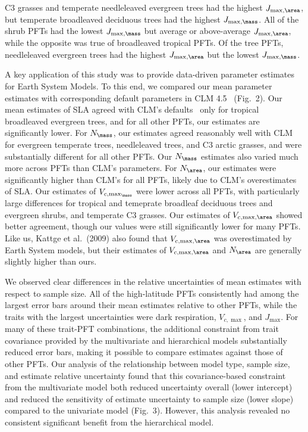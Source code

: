 C3 grasses and temperate needleleaved evergreen trees had the highest $J_{\max,\area}$, but temperate broadleaved deciduous trees had the highest $J_{\max,\mass}$.
All of the shrub PFTs had the lowest $J_{\max,\mass}$ but average or above-average $J_{\max,\area}$, while the opposite was true of broadleaved tropical PFTs.
Of the tree PFTs, needleleaved evergreen trees had the highest $J_{\max,\area}$ but the lowest $J_{\max,\mass}$.

A key application of this study was to provide data-driven parameter estimates for Earth System Models.
To this end, we compared our mean parameter estimates with corresponding default parameters in CLM 4.5~\cite{clm45_note} (Fig.\ 2).
Our mean estimates of SLA agreed with CLM's defaults~\cite[Table 8.1 in]{clm45_note} only for tropical broadleaved evergreen trees, and for all other PFTs, our estimates are significantly lower.
For $N_{\mass}$, our estimates agreed reasonably well with CLM for evergreen temperate trees, needleleaved trees, and C3 arctic grasses, and were substantially different for all other PFTs.
Our $N_{\mass}$ estimates also varied much more across PFTs than CLM's parameters.
For $N_{\area}$, our estimates were significantly higher than CLM's for all PFTs, likely due to CLM's overestimates of SLA\@.
Our estimates of $V_{c,\max_\mass}$ were lower across all PFTs, with particularly large differences for tropical and temeprate broadleaf deciduous trees and evergreen shrubs, and temperate C3 grasses.
Our estimates of $V_{c,\max,\area}$ showed better agreement, though our values were still significantly lower for many PFTs.
Like us, Kattge et al.~(2009) \nocite{kattge_2009_vcmax} also found that $V_{c,\max,\area}$ was overestimated by Earth System models,
but their estimates of $V_{c,\max,\area}$ and $N_{\area}$ are generally slightly higher than ours.

We observed clear differences in the relative uncertainties of mean estimates with respect to sample size.
All of the high-latitude PFTs consistently had among the largest error bars around their mean estimates relative to other PFTs, while the traits with the largest uncertainties were dark respiration, $V_{c,\max}$, and $J_{\max}$.
For many of these trait-PFT combinations, the additional constraint from trait covariance provided by the multivariate and hierarchical models substantially reduced error bars, making it possible to compare estimates against those of other PFTs.
Our analysis of the relationship between model type, sample size, and estimate relative uncertainty found that this covariance-based constraint from the multivariate model both reduced uncertainty overall (lower intercept) and reduced the sensitivity of estimate uncertainty to sample size (lower slope) compared to the univariate model (Fig.\ 3).
However, this analysis revealed no consistent significant benefit from the hierarchical model.


